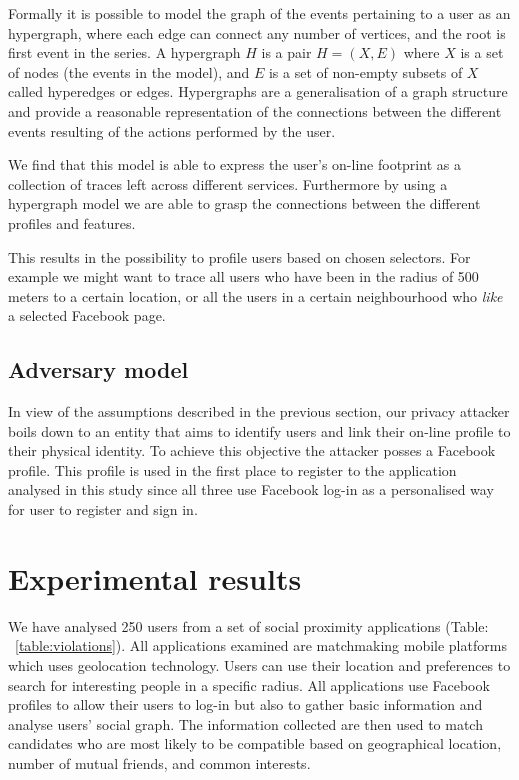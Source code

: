 Formally it is possible to model the graph of the events pertaining to a user as an hypergraph, where each edge can connect any number of vertices, and the root is first event in the series.  A hypergraph $H$ is a pair $H = (X,E)$ where $X$ is a set of nodes (the events in the model), and $E$ is a set of non-­empty subsets of $X$ called hyperedges or edges. Hypergraphs are a generalisation of a graph structure and provide a reasonable representation of the connections between the different events resulting of the actions performed by the user.

We find that this model is able to express the user's on-line footprint as a collection of traces left across different services. Furthermore by using a hypergraph model we are able to grasp the connections between the different profiles and features.

This results in the possibility to profile users based on chosen selectors. For example we might want to trace all users who have been in the radius of 500 meters to a certain location, or all the users in a certain neighbourhood who \emph{like} a selected Facebook page.

\subsection{Adversary model}

In view of the assumptions described in the previous section, our privacy attacker boils down to an entity that aims to identify users and link their on-line profile to their physical identity. To achieve this objective the attacker posses a Facebook profile. This profile is used in the first place to register to the application analysed in this study since all three use Facebook log-in as a personalised way for user to register and sign in.

\section{Experimental results}
\label{sec:exp-results}
We have analysed 250 users from a set of social proximity applications (Table: ~\ref{table:violations}). All applications examined are matchmaking mobile platforms which uses geolocation technology. Users can use their location and preferences to search for interesting people in a specific radius. All applications use Facebook profiles to allow their users to log-in but also to gather basic information and analyse users' social graph. The information collected are then used to match candidates who are most likely to be compatible based on geographical location, number of mutual friends, and common interests.

